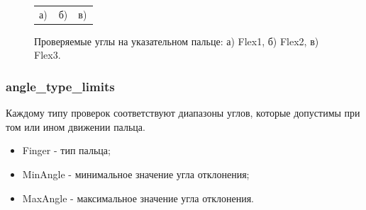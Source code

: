 \begin{figure}[H]
\begin{minipage}[h]{0.32\linewidth}
\end{minipage}
\hfill
\begin{minipage}[h]{0.32\linewidth}
\end{minipage}
\begin{minipage}[h]{1\linewidth}
\begin{tabular}{p{0.32\linewidth}p{0.32\linewidth}p{0.32\linewidth}}
\centering а) & \centering б) & \centering в) \\
\end{tabular}
\end{minipage}
\vspace*{-1cm}
\caption{Проверяемые углы на указательном пальце: а) Flex1, б) Flex2, в) Flex3.}
\label{fig:finger_motion_type_3}
\end{figure}

\subsubsection{angle\_type\_limits}
\hspace{0.6cm} Каждому типу проверок соответствуют диапазоны углов, которые допустимы при том или ином движении пальца.

\begin{itemize}
	\item Finger - тип пальца;
	\item MinAngle - минимальное значение угла отклонения;
	\item MaxAngle - максимальное значение угла отклонения.
\end{itemize}

